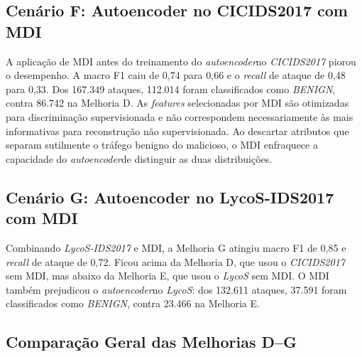 \subsection{Cenário F: Autoencoder no CICIDS2017 com MDI}





A aplicação de MDI antes do treinamento do \textit{autoencoder}no \textit{CICIDS2017} piorou o desempenho. A macro F1 caiu de 0,74 para 0,66 e o \textit{recall} de ataque de 0,48 para 0,33. Dos 167.349 ataques, 112.014 foram classificados como \textit{BENIGN}, contra 86.742 na Melhoria D. As \textit{features} selecionadas por MDI são otimizadas para discriminação supervisionada e não correspondem necessariamente às mais informativas para reconstrução não supervisionada. Ao descartar atributos que separam sutilmente o tráfego benigno do malicioso, o MDI enfraquece a capacidade do \textit{autoencoder}de distinguir as duas distribuições.

\subsection{Cenário G: Autoencoder no LycoS-IDS2017 com MDI}





Combinando \textit{LycoS-IDS2017} e MDI, a Melhoria G atingiu macro F1 de 0,85 e \textit{recall} de ataque de 0,72. Ficou acima da Melhoria D, que usou o \textit{CICIDS2017} sem MDI, mas abaixo da Melhoria E, que usou o \textit{LycoS} sem MDI. O MDI também prejudicou o \textit{autoencoder}no \textit{LycoS}: dos 132.611 ataques, 37.591 foram classificados como \textit{BENIGN}, contra 23.466 na Melhoria E.

\subsection{Comparação Geral das Melhorias D–G}

